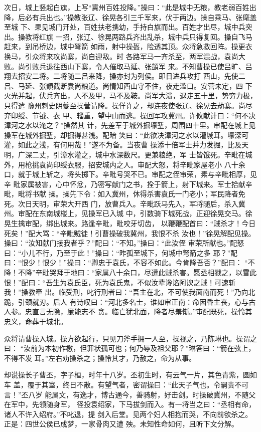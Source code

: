 次日，城上竖起白旗，上写“冀州百姓投降。”操曰：“此是城中无粮，教老弱百姓出
降，后必有兵出也。”操教张辽、徐晃各引三千军来，伏于两边。操自乘马、张麾盖至城
下、果见城门开处，百姓扶老携幼，手持白旗而出。百姓才出尽，城中兵突出。操教将红旗
一招，张辽、徐晃两路兵齐出乱杀，城中兵只得复回。操自飞马赶来，到吊桥边，城中弩箭
如雨，射中操盔，险透其顶。众将急救回阵。操更衣换马，引众将来攻尚寨，尚自迎敌。时
各路军马一齐杀至，两军混战，袁尚大败。尚引败兵退往西山下寨，令人催取马延、张顗军
来。不知曹操已使吕旷、吕翔去招安二将。二将随二吕来降，操亦封为列侯。即日进兵攻打
西山，先使二吕、马延、张顗截断袁尚粮道。尚情知西山守不住，夜走滥口。安营未定，四
下火光并起，伏兵齐出，人不及甲，马不及鞍。尚军大溃，退走五十里，势穷力极，只得遣
豫州刺史阴夔至操营请降。操佯许之，却连夜使张辽、徐晃去劫寨。尚尽弃印绶、节钺、衣
甲、辎重，望中山而逃。操回军攻冀州。许攸献计曰：“何不决漳河之水以淹之？”操然其
计，先差军于城外掘壕堑，周围四十里。审配在城上见操军在城外掘堑，却掘得甚浅。配暗
笑曰：“此欲决漳河之水以灌城耳。壕深可灌，如此之浅，有何用哉！”遂不为备。当夜曹
操添十倍军士并力发掘，比及天明，广深二丈，引漳水灌之，城中水深数尺。更兼粮绝，军
士皆饿死。辛毗在城外，用枪挑袁尚印绶衣服，招安城内之人。审配大怒，将辛毗家屋老小
八十余口，就于城上斩之，将头掷下。辛毗号哭不已。审配之侄审荣，素与辛毗相厚，见辛
毗家属被害，心中怀忿，乃密写献门之书，拴于箭上，射下城来。军士拾献辛毗，毗将书献
操。操先下令：如入冀州，休得杀害袁氏一门老小；军民降者免死。次日天明，审荣大开西
门，放曹兵入。辛毗跃马先入，军将随后，杀入冀州。审配在东南城楼上，见操军已入城
中，引数骑下城死战，正迎徐晃交马。徐晃生擒审配，绑出城来。路逢辛毗，毗咬牙切齿，
以鞭鞭配首曰：“贼杀才！今日死矣！”配大骂：“辛毗贼徒！引曹操破我冀州，我恨不杀
汝也！”徐晃解配见操。操曰：“汝知献门接我者乎？”配曰：“不知。”操曰：“此汝侄
审荣所献也。”配怒曰：“小儿不行，乃至于此！”操曰：“昨孤至城下，何城中弩箭之多
耶？”配曰：“恨少！恨少！”操曰：“卿忠于袁氏，不容不如此。今肯降吾否？”配曰：
“不降！不降”辛毗哭拜于地曰：“家属八十余口，尽遭此贼杀害。愿丞相戮之，以雪此
恨！”配曰：“吾生为袁氏臣，死为袁氏鬼，不似汝辈谗谄阿谀之贼！可速斩我！”操教牵
出。临受刑，叱行刑者曰：“吾主在北，不可使我面南而死！”乃向北跪，引颈就刃。后人
有诗叹曰：“河北多名士，谁如审正南：命因昏主丧，心与古人参。忠直言无隐，廉能志不
贪。临亡犹北面，降者尽羞惭。”审配既死，操怜其忠义，命葬于城北。

众将请曹操入城。操方欲起行，只见刀斧手拥一人至，操视之，乃陈琳也。操谓之曰：
“汝前为本初作檄，但罪状孤可也；何乃辱及祖父耶？”琳答曰：“箭在弦上，不得不发
耳。”左右劝操杀之；操怜其才，乃赦之，命为从事。

却说操长子曹丕，字子桓，时年十八岁。丕初生时，有云气一片，其色青紫，圆如车
盖，覆于其室，终日不散。有望气者，密谓操曰：“此天子气也。令嗣贵不可言！”丕八岁
能属文，有逸才，博古通今，善骑射，好击剑。时操破冀州，不随父在军中，先领随身军，
径投袁绍家，下马拔剑而入。有一将当之曰：“丞相有命，诸人不许入绍府。”不叱退，提
剑入后堂。见两个妇人相抱而哭，不向前欲杀之。正是：四世公侯已成梦，一家骨肉又遭
殃。未知性命如何，且听下文分解。